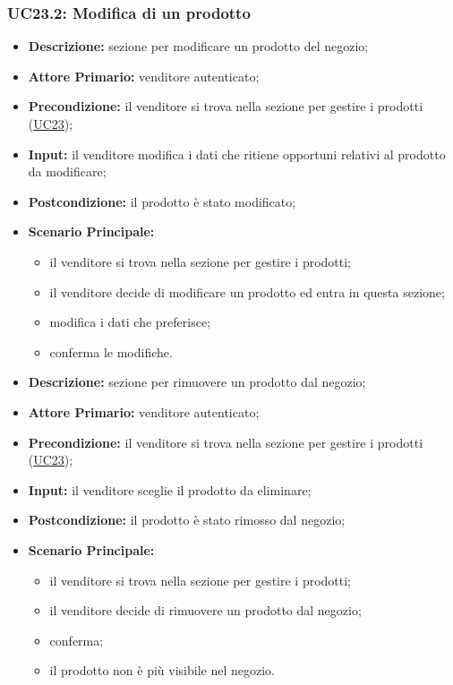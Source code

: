         \subsubsection{UC23.2: Modifica di un prodotto}
        \begin{itemize}
            \item \textbf{Descrizione:} sezione per modificare un prodotto del negozio;
            \item \textbf{Attore Primario:} venditore autenticato;
            \item \textbf{Precondizione:} il venditore si trova nella sezione per gestire i prodotti (\hyperref[sec:UC23]{\underline{UC23}});
            \item \textbf{Input:} il venditore modifica i dati che ritiene opportuni relativi al prodotto da modificare;
            \item \textbf{Postcondizione:} il prodotto è stato modificato;
            \item \textbf{Scenario Principale:} 
                \begin{itemize}
                    \item il venditore si trova nella sezione per gestire i prodotti;
                    \item il venditore decide di modificare un prodotto ed entra in questa sezione;
                    \item modifica i dati che preferisce;
                    \item conferma le modifiche.
                \end{itemize}
        \end{itemize}
        \begin{itemize}
            \item \textbf{Descrizione:} sezione per rimuovere un prodotto dal negozio;
            \item \textbf{Attore Primario:} venditore autenticato;
            \item \textbf{Precondizione:} il venditore si trova nella sezione per gestire i prodotti (\hyperref[sec:UC23]{\underline{UC23}});
            \item \textbf{Input:} il venditore sceglie il prodotto da eliminare;
            \item \textbf{Postcondizione:} il prodotto è stato rimosso dal negozio;
            \item \textbf{Scenario Principale:} 
                \begin{itemize}
                    \item il venditore si trova nella sezione per gestire i prodotti;
                    \item il venditore decide di rimuovere un prodotto dal negozio;
                    \item conferma;
                    \item il prodotto non è più visibile nel negozio.
                \end{itemize}
        \end{itemize}


